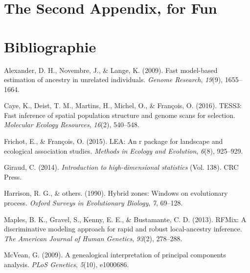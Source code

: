 \documentclass[12pt,twoside]{reedthesis}
\begin{document}
  \chapter{The Second Appendix, for
  Fun}\label{the-second-appendix-for-fun}
  
  \backmatter
  
  \chapter*{Bibliographie}\label{bibliographie}
  
  \noindent
  
  \setlength{\parindent}{-0.20in} \setlength{\leftskip}{0.20in}
  \setlength{\parskip}{8pt}
  
  \hypertarget{refs}{}
  \hypertarget{ref-alexander2009fast}{}
  Alexander, D. H., Novembre, J., \& Lange, K. (2009). Fast model-based
  estimation of ancestry in unrelated individuals. \emph{Genome Research},
  \emph{19}(9), 1655--1664.
  
  \hypertarget{ref-caye2016tess3}{}
  Caye, K., Deist, T. M., Martins, H., Michel, O., \& François, O. (2016).
  TESS3: Fast inference of spatial population structure and genome scans
  for selection. \emph{Molecular Ecology Resources}, \emph{16}(2),
  540--548.
  
  \hypertarget{ref-frichot2015lea}{}
  Frichot, E., \& François, O. (2015). LEA: An r package for landscape and
  ecological association studies. \emph{Methods in Ecology and Evolution},
  \emph{6}(8), 925--929.
  
  \hypertarget{ref-giraud2014introduction}{}
  Giraud, C. (2014). \emph{Introduction to high-dimensional statistics}
  (Vol. 138). CRC Press.
  
  \hypertarget{ref-harrison1990hybrid}{}
  Harrison, R. G., \& others. (1990). Hybrid zones: Windows on
  evolutionary process. \emph{Oxford Surveys in Evolutionary Biology},
  \emph{7}, 69--128.
  
  \hypertarget{ref-maples2013rfmix}{}
  Maples, B. K., Gravel, S., Kenny, E. E., \& Bustamante, C. D. (2013).
  RFMix: A discriminative modeling approach for rapid and robust
  local-ancestry inference. \emph{The American Journal of Human Genetics},
  \emph{93}(2), 278--288.
  
  \hypertarget{ref-mcvean2009genealogical}{}
  McVean, G. (2009). A genealogical interpretation of principal components
  analysis. \emph{PLoS Genetics}, \emph{5}(10), e1000686.
  
\end{document}
